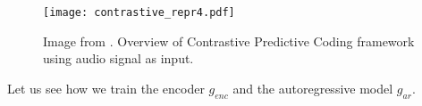 \begin{figure}[H]
    \centering 
    \texttt{[image: contrastive\_repr4.pdf]}
    \caption{Image from \citep{oord_representation_2019}. Overview of Contrastive Predictive Coding framework using audio signal as input. }
\end{figure}



Let us see how we train the encoder $g_{enc}$ and the autoregressive model $g_{ar}$.\\